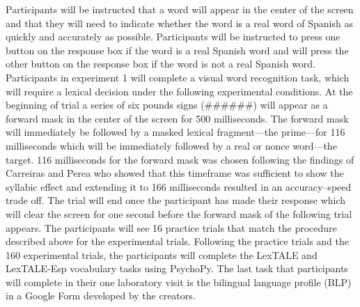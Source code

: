 \documentclass[
12pt, %
english, %
doublespacing, %
nolistspacing, %
liststotoc, %
headsepline, %
chapterinoneline, %
openany, %
]{DoctoralThesis}\usepackage[]{graphicx}\usepackage[]{color}
\begin{document}
Participants will be instructed that a word will appear in the center of the screen and that they will need to indicate whether the word is a real word of Spanish as quickly and accurately as possible. Participants will be instructed to press one button on the response box if the word is a real Spanish word and will press the other button on the response box if the word is not a real Spanish word. Participants in experiment 1 will complete a visual word recognition task, which will require a lexical decision under the following experimental conditions. At the beginning of trial a series of six pounds signs (\#\#\#\#\#\#) will appear as a forward mask in the center of the screen for 500 milliseconds. The forward mask will immediately be followed by a masked lexical fragment—the prime—for 116 milliseconds which will be immediately followed by a real or nonce word—the target. 116 milliseconds for the forward mask was chosen following the findings of Carreiras and Perea \parencite*{Carreiras2002-mp} who showed that this timeframe was sufficient to show the syllabic effect and extending it to 166 milliseconds resulted in an accuracy–speed trade off. The trial will end once the participant has made their response which will clear the screen for one second before the forward mask of the following trial appears. The participants will see 16 practice trials that match the procedure described above for the experimental trials. Following the practice trials and the 160 experimental trials, the participants will complete the LexTALE and LexTALE-Esp vocabulary tasks using PsychoPy. The last task that participants will complete in their one laboratory visit is the bilingual language profile (BLP) in a Google Form developed by the creators.





\end{document}
